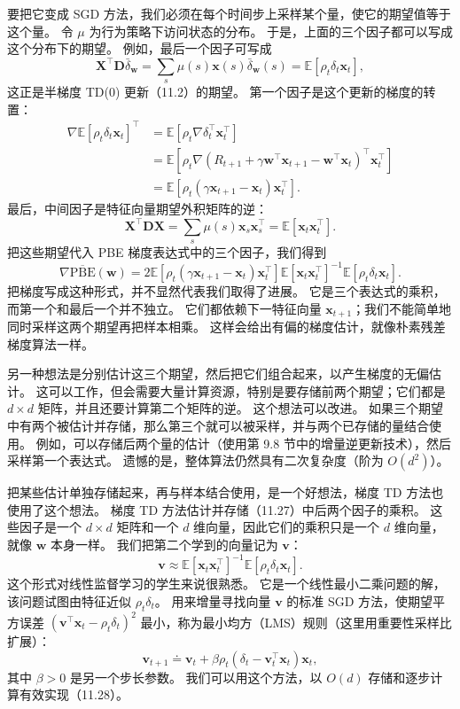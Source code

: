 \documentclass[UTF8, 12pt, fontset=fandol, oneside]{ctexart}
\begin{document}
要把它变成 SGD 方法，我们必须在每个时间步上采样某个量，使它的期望值等于这个量。
令 $\mu$ 为行为策略下访问状态的分布。
于是，上面的三个因子都可以写成这个分布下的期望。
例如，最后一个因子可写成
\[
\mathbf{X}^\top\mathbf{D}\bar\delta_{\mathbf{w}}
=\sum_s\mu(s)\mathbf{x}(s)\bar\delta_{\mathbf{w}}(s)
=\mathbb{E}[\rho_t\delta_t\mathbf{x}_t],
\]
这正是半梯度 TD(0) 更新（11.2）的期望。
第一个因子是这个更新的梯度的转置：
\[
\begin{aligned}
\nabla\mathbb{E}[\rho_t\delta_t\mathbf{x}_t]^\top
&=\mathbb{E}\left[\rho_t\nabla\delta_t^\top\mathbf{x}_t^\top\right]\\
&=\mathbb{E}\left[\rho_t\nabla(R_{t+1}+\gamma\mathbf{w}^\top\mathbf{x}_{t+1}-\mathbf{w}^\top\mathbf{x}_t)^\top\mathbf{x}_t^\top\right]\\
&=\mathbb{E}\left[\rho_t(\gamma\mathbf{x}_{t+1}-\mathbf{x}_t)\mathbf{x}_t^\top\right].
\end{aligned}
\]
最后，中间因子是特征向量期望外积矩阵的逆：
\[
\mathbf{X}^\top\mathbf{D}\mathbf{X}
=\sum_s\mu(s)\mathbf{x}_s\mathbf{x}_s^\top
=\mathbb{E}[\mathbf{x}_t\mathbf{x}_t^\top].
\]
把这些期望代入 PBE 梯度表达式中的三个因子，我们得到
\begin{equation}
\nabla\overline{\mathrm{PBE}}(\mathbf{w})
=2\mathbb{E}\left[\rho_t(\gamma\mathbf{x}_{t+1}-\mathbf{x}_t)\mathbf{x}_t^\top\right]
\mathbb{E}\left[\mathbf{x}_t\mathbf{x}_t^\top\right]^{-1}
\mathbb{E}\left[\rho_t\delta_t\mathbf{x}_t\right].
\tag{11.27}
\end{equation}
把梯度写成这种形式，并不显然代表我们取得了进展。
它是三个表达式的乘积，而第一个和最后一个并不独立。
它们都依赖下一特征向量 $\mathbf{x}_{t+1}$；我们不能简单地同时采样这两个期望再把样本相乘。
这样会给出有偏的梯度估计，就像朴素残差梯度算法一样。

另一种想法是分别估计这三个期望，然后把它们组合起来，以产生梯度的无偏估计。
这可以工作，但会需要大量计算资源，特别是要存储前两个期望；它们都是 $d\times d$ 矩阵，并且还要计算第二个矩阵的逆。
这个想法可以改进。
如果三个期望中有两个被估计并存储，那么第三个就可以被采样，并与两个已存储的量结合使用。
例如，可以存储后两个量的估计（使用第 9.8 节中的增量逆更新技术），然后采样第一个表达式。
遗憾的是，整体算法仍然具有二次复杂度（阶为 $O(d^2)$）。

把某些估计单独存储起来，再与样本结合使用，是一个好想法，梯度 TD 方法也使用了这个想法。
梯度 TD 方法估计并存储（11.27）中后两个因子的乘积。
这些因子是一个 $d\times d$ 矩阵和一个 $d$ 维向量，因此它们的乘积只是一个 $d$ 维向量，就像 $\mathbf{w}$ 本身一样。
我们把第二个学到的向量记为 $\mathbf{v}$：
\begin{equation}
\mathbf{v}\approx
\mathbb{E}\left[\mathbf{x}_t\mathbf{x}_t^\top\right]^{-1}\mathbb{E}\left[\rho_t\delta_t\mathbf{x}_t\right].
\tag{11.28}
\end{equation}
这个形式对线性监督学习的学生来说很熟悉。
它是一个线性最小二乘问题的解，该问题试图由特征近似 $\rho_t\delta_t$。
用来增量寻找向量 $\mathbf{v}$ 的标准 SGD 方法，使期望平方误差 $(\mathbf{v}^\top\mathbf{x}_t-\rho_t\delta_t)^2$ 最小，称为最小均方（LMS）规则（这里用重要性采样比扩展）：
\[
\mathbf{v}_{t+1}\doteq \mathbf{v}_t+\beta\rho_t(\delta_t-\mathbf{v}_t^\top\mathbf{x}_t)\mathbf{x}_t,
\]
其中 $\beta>0$ 是另一个步长参数。
我们可以用这个方法，以 $O(d)$ 存储和逐步计算有效实现（11.28）。
\end{document}
